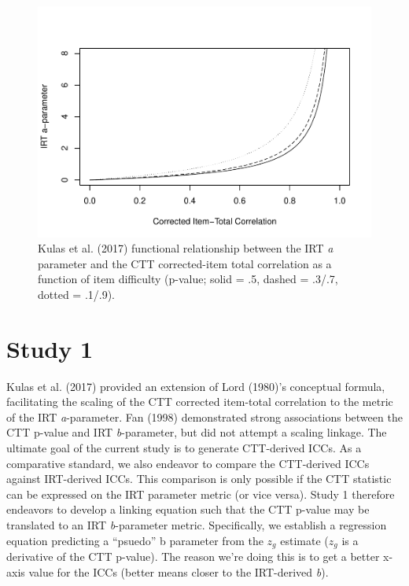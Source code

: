 \documentclass[
  man]{apa6}
\begin{document}
\begin{figure}
\centering
\includegraphics{ICC_project_files/figure-latex/acorrected-1.pdf}
\caption{\label{fig:acorrected}Kulas et al. (2017) functional relationship between the IRT \emph{a} parameter and the CTT corrected-item total correlation as a function of item difficulty (p-value; solid = .5, dashed = .3/.7, dotted = .1/.9).}
\end{figure}

\hypertarget{study-1}{%
\section{Study 1}\label{study-1}}

Kulas et al. (2017) provided an extension of Lord (1980)'s conceptual formula, facilitating the scaling of the CTT corrected item-total correlation to the metric of the IRT \emph{a}-parameter. Fan (1998) demonstrated strong associations between the CTT p-value and IRT \emph{b}-parameter, but did not attempt a scaling linkage. The ultimate goal of the current study is to generate CTT-derived ICCs. As a comparative standard, we also endeavor to compare the CTT-derived ICCs against IRT-derived ICCs. This comparison is only possible if the CTT statistic can be expressed on the IRT parameter metric (or vice versa). Study 1 therefore endeavors to develop a linking equation such that the CTT p-value may be translated to an IRT \emph{b}-parameter metric. Specifically, we establish a regression equation predicting a ``psuedo'' b parameter from the \(z_{g}\) estimate (\(z_{g}\) is a derivative of the CTT p-value). The reason we're doing this is to get a better x-axis value for the ICCs (better means closer to the IRT-derived \emph{b}).
\end{document}
